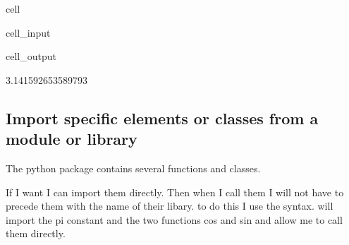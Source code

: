 \documentclass[letterpaper,10pt,english]{jupyterBook}
\begin{document}
\begin{sphinxuseclass}{cell}\begin{sphinxVerbatimInput}

\begin{sphinxuseclass}{cell_input}
\begin{sphinxVerbatim}[commandchars=\\\{\}]
 

\end{sphinxVerbatim}

\end{sphinxuseclass}\end{sphinxVerbatimInput}
\begin{sphinxVerbatimOutput}

\begin{sphinxuseclass}{cell_output}
\begin{sphinxVerbatim}[commandchars=\\\{\}]
3.141592653589793
\end{sphinxVerbatim}

\end{sphinxuseclass}\end{sphinxVerbatimOutput}

\end{sphinxuseclass}

\subsection{Import specific elements or classes from a module or library}
\label{\detokenize{content/04_PythonEssentials/PythonPandasDataframes:import-specific-elements-or-classes-from-a-module-or-library}}
\sphinxAtStartPar
The python package  contains several functions and classes.

\sphinxAtStartPar
If I want I can import them directly. Then when I call them I will not have to precede them with the name of their libary. to do this I use the  syntax.   will import the pi constant and the two functions cos and sin and allow me to call them directly.
\end{document}
